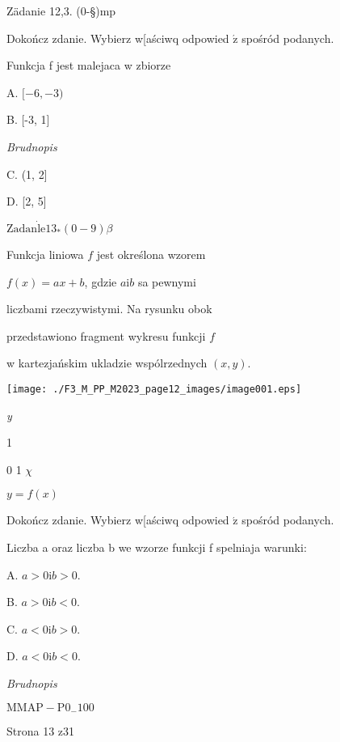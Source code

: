 \documentclass[a4paper,12pt]{article}
\begin{document}
Zädanie 12,3. (0-\S)mp

Dokończ zdanie. Wybierz w[aściwq odpowied $\acute{\mathrm{z}}$ spośród podanych.

Funkcja f jest malejaca w zbiorze

A. $[-6,-3)$

B. [-3, 1]

{\it Brudnopis}

C. (1, 2]

D. [2, 5]

$\mathrm{Z}\mathrm{a}\mathrm{d}\mathrm{a}\mathrm{n}\dot{\mathrm{l}}\mathrm{e}13_{*}(0-9) \beta$

Funkcja liniowa $f$ jest określona wzorem

$f(x)=ax+b$, gdzie $a \mathrm{i} b$ sa pewnymi

liczbami rzeczywistymi. Na rysunku obok

przedstawiono fragment wykresu funkcji $f$

w kartezjańskim ukladzie wspólrzednych $(x,y).$
\begin{center}
\texttt{[image: ./F3\_M\_PP\_M2023\_page12\_images/image001.eps]}
\end{center}
{\it y}

1

0 1  $\chi$

$y=f(x)$

Dokończ zdanie. Wybierz w[aściwq odpowied $\acute{\mathrm{z}}$ spośród podanych.

Liczba a oraz liczba b we wzorze funkcji f spelniaja warunki:

A. $a>0 \mathrm{i} b>0.$

B. $a>0 \mathrm{i} b<0.$

C. $a<0 \mathrm{i} b>0.$

D. $a<0 \mathrm{i} b<0.$

{\it Brudnopis}

$\mathrm{M}\mathrm{M}\mathrm{A}\mathrm{P}-\mathrm{P}0_{-}100$

Strona 13 z31
\end{document}
